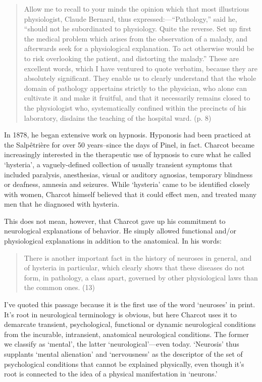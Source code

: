 \begin{quote}

Allow me to recall to your minds the opinion which that most illustrious physiologist, Claude Bernard, thus expressed:—“Pathology,” said he, “should not he subordinated to physiology. Quite the reverse. Set up first the medical problem which arises from the observation of a malady, and afterwards seek for a physiological explanation. To act otherwise would be to risk overlooking the patient, and distorting the malady.” These are excellent words, which I have ventured to quote verbatim, because they are absolutely significant. They enable us to clearly understand that the whole domain of pathology appertains strictly to the physician, who alone can cultivate it and make it fruitful, and that it necessarily remains closed to the physiologist who, systematically confined within the precincts of his laboratory, disdains the teaching of the hospital ward. (p. 8)
\end{quote}

In 1878, he began extensive work on hypnosis. Hyponosis had been practiced at the Salpêtrière for over 50 years--since the days of Pinel, in fact. Charcot became increasingly interested in the therapeutic use of hypnosis to cure what he called `hysteria', a vaguely-defined collection of usually transient symptoms that included paralysis, anesthesias, visual or auditory agnosias, temporary blindness or deafness, amnesia and seizures. While `hysteria' came to be identified closely with women, Charcot himself believed that it could effect men, and treated many men that he diagnosed with hysteria.

This does not mean, however, that Charcot gave up his commitment to neurological explanations of behavior. He simply allowed functional and\slash or physiological explanations in addition to the anatomical. In his words:

\begin{quote}

There is another important fact in the history of neuroses in general, and of hysteria in particular, which clearly shows that these diseases do not form, in pathology, a class apart, governed by other physiological laws than the common ones. (13)
\end{quote}

I've quoted this passage because it is the first use of the word `neuroses' in print. It's root in neurological terminology is obvious, but here Charcot uses it to demarcate transient, psychological, functional or dynamic neurological conditions from the incurable, intransient, anatomical neurological conditions. The former we classify as ‘mental’, the latter ‘neurological’---even today. `Neurosis' thus supplants `mental alienation' and `nervousness' as the descriptor of the set of psychological conditions that cannot be explained physically, even though it’s root is connected to the idea of a physical manifestation in ‘neurons.’

